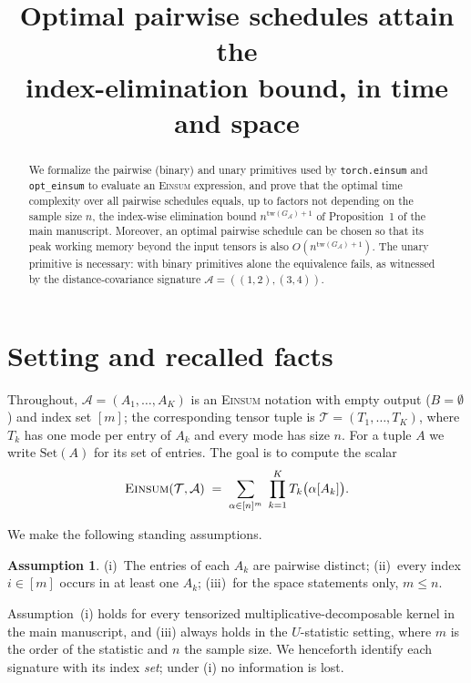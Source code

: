 \documentclass[11pt]{article}
\title{Optimal pairwise \Einsum{} schedules attain the\\
index-elimination bound, in time and space}
\author{}
\date{}
\newcommand{\Einsum}{\textsc{Einsum}}
\newcommand{\calA}{\mathcal{A}}
\newcommand{\calT}{\mathcal{T}}
\newcommand{\tw}{\mathrm{tw}}
\newcommand{\treewidthp}[1]{\tw(#1)}
\newcommand{\takesetp}[1]{\mathrm{Set}(#1)}
\newcommand{\graphform}[1]{G_{#1}}
\newcommand{\opteinsum}{\texttt{opt\_einsum}}
\newcommand{\torcheinsum}{\texttt{torch.einsum}}
\theoremstyle{plain}
\theoremstyle{definition}
\newtheorem{assumption}{Assumption}
\theoremstyle{remark}
\begin{document}
\maketitle

\begin{abstract}
\noindent
We formalize the pairwise (binary) and unary primitives used by
\torcheinsum{} and \opteinsum{} to evaluate an \Einsum{} expression, and
prove that the optimal time complexity over all pairwise schedules equals,
up to factors not depending on the sample size $n$, the index-wise
elimination bound $n^{\treewidthp{\graphform{\calA}}+1}$ of Proposition~1 of the
main manuscript.  Moreover, an optimal pairwise schedule can be chosen so
that its peak working memory beyond the input tensors is also
$O(n^{\treewidthp{\graphform{\calA}}+1})$.  The unary primitive is necessary: with
binary primitives alone the equivalence fails, as witnessed by the
distance-covariance signature $\calA=((1,2),(3,4))$.
\end{abstract}

\section{Setting and recalled facts}
\label{sec:setup}

Throughout, $\calA = (A_1,\dots,A_K)$ is an \Einsum{} notation with empty
output ($B=\emptyset$) and index set $[m]$; the corresponding tensor tuple
is $\calT = (T_1,\dots,T_K)$, where $T_k$ has one mode per entry of $A_k$
and every mode has size $n$.  For a tuple $A$ we write $\takesetp{A}$ for
its set of entries.  The goal is to compute the scalar
\begin{align*}
   \Einsum(\calT,\calA)
   \;=\;
   \sum_{\alpha \in [n]^m}\; \prod_{k=1}^{K} T_k\bigl(\alpha[A_k]\bigr).
\end{align*}

We make the following standing assumptions.

\begin{assumption}
\label{ass:standing}
(i)~The entries of each $A_k$ are pairwise distinct; (ii)~every index
$i \in [m]$ occurs in at least one $A_k$; (iii)~for the space statements
only, $m \le n$.
\end{assumption}

Assumption~(i) holds for every tensorized multiplicative-decomposable
kernel in the main manuscript, and (iii) always holds in the
$U$-statistic setting, where $m$ is the order of the statistic and $n$ the
sample size.  We henceforth identify each signature with its index
\emph{set}; under (i) no information is lost.
\end{document}
